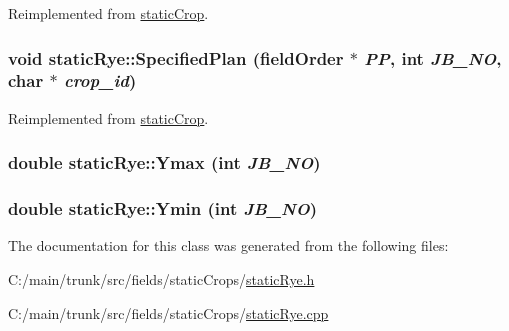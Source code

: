 Reimplemented from \hyperlink{classstatic_crop_ab7763e4e6a0b9eff1788cb86ebad8170}{staticCrop}.\hypertarget{classstatic_rye_a9842ed0a85f8e721762a72f0d2252587}{
\subsubsection[{SpecifiedPlan}]{\setlength{\rightskip}{0pt plus 5cm}void staticRye::SpecifiedPlan ({\bf fieldOrder} $\ast$ {\em PP}, \/  int {\em JB\_\-NO}, \/  char $\ast$ {\em crop\_\-id})}}
\label{classstatic_rye_a9842ed0a85f8e721762a72f0d2252587}


Reimplemented from \hyperlink{classstatic_crop_af19d8a1e4f4833325f6712c22ede8b45}{staticCrop}.\hypertarget{classstatic_rye_af2cca3d5d8190bc8708a5244b5dc9824}{
\subsubsection[{Ymax}]{\setlength{\rightskip}{0pt plus 5cm}double staticRye::Ymax (int {\em JB\_\-NO})}}
\label{classstatic_rye_af2cca3d5d8190bc8708a5244b5dc9824}
\hypertarget{classstatic_rye_a81ed178d1e0b0004c1ae96a8805c1705}{
\subsubsection[{Ymin}]{\setlength{\rightskip}{0pt plus 5cm}double staticRye::Ymin (int {\em JB\_\-NO})}}
\label{classstatic_rye_a81ed178d1e0b0004c1ae96a8805c1705}


The documentation for this class was generated from the following files:\begin{DoxyCompactItemize}
\item 
C:/main/trunk/src/fields/staticCrops/\hyperlink{static_rye_8h}{staticRye.h}\item 
C:/main/trunk/src/fields/staticCrops/\hyperlink{static_rye_8cpp}{staticRye.cpp}\end{DoxyCompactItemize}
